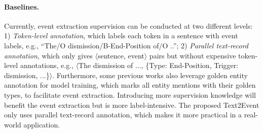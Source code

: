 \documentclass[11pt,a4paper]{article}
\begin{document}
\begin{table}[!t]
    \centering
    \setlength{\belowcaptionskip}{-0.5cm}
    \caption{Dataset statistics.}
    \label{tab:dataset}
\end{table}%
\paragraph{Baselines.}

Currently, event extraction supervision can be conducted at two different levels:
1) \textit{Token-level annotation}, which labels each token in a sentence with event labels, e.g., ``The/O dismission/B-End-Position of/O ..'';
2) \textit{Parallel text-record annotation}, which only gives $\langle$sentence, event$\rangle$ pairs but without expensive token-level annotations, e.g., $\langle$The dismission of ..., \{Type: End-Position, Trigger: dismission, ...\}$\rangle$.
Furthermore, some previous works also leverage golden entity annotation for model training, which marks all entity mentions with their golden types, to facilitate event extraction.
Introducing more supervision knowledge will benefit the event extraction but is more label-intensive.
The proposed Text2Event only uses parallel text-record annotation, which makes it more practical in a real-world application.
\end{document}
